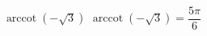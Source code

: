  {$\operatorname{arccot} \left( -\sqrt{3} \right)$ }
{ $\operatorname{arccot} \left( -\sqrt{3} \right) = \dfrac{5\pi}{6}$}
